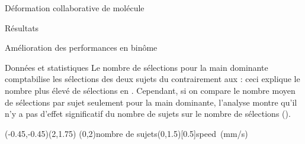 \documentclass[myfrancais,ngerman,english,french]{mythesis}
\begin{document}
\begin{mychapter}{Déformation collaborative de molécule}
\begin{mysection}{Résultats}
\begin{mysubsection}{Amélioration des performances en binôme}
\begin{mysubsubsection}{Données et statistiques}
					Le nombre de sélections pour la main dominante comptabilise les sélections des deux sujets du  contrairement aux  : ceci explique le nombre plus élevé de sélections en .
					Cependant, si on compare le nombre moyen de sélections par sujet seulement pour la main dominante, l'analyse montre qu'il n'y a pas d'effet significatif du nombre de sujets  sur le nombre de sélections  ().

					\begin{myfigure}
						\begin{myps}(-0.45,-0.45)(2,1.75)
							\myaxes(0,2){nombre de sujets}(0,1.5)[0.5]{speed~(mm/s)}
						\end{myps}
					\end{myfigure}


\end{mysubsubsection}
\end{mysubsection}
\end{mysection}
\end{mychapter}
\end{document}
